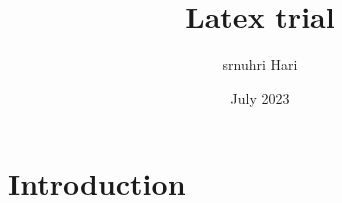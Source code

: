 \documentclass{article}
\title{Latex trial}
\author{srnuhri Hari}
\date{July 2023}
\begin{document}
\maketitle

\section{Introduction}
\end{document}
